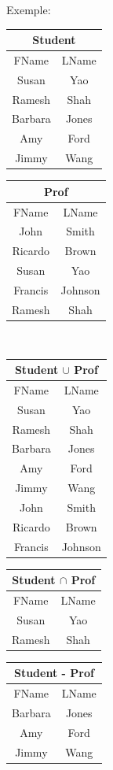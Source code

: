 \documentclass[a4paper]{article}
\begin{document}
  
      Exemple:
\begin{tabular}{|c|c|}
	\multicolumn{2}{c}{Student}\\
	\hline
	FName & LName\\
	\hline\hline
	Susan & Yao\\
	Ramesh & Shah\\
	Barbara & Jones\\
	Amy & Ford\\
	Jimmy & Wang\\
	\hline
\end{tabular}
\begin{tabular}{|c|c|}
	\multicolumn{2}{c}{Prof}\\
	\hline
	FName & LName\\
	\hline\hline
	John & Smith\\
	Ricardo & Brown\\
	Susan  &Yao\\
	Francis  & Johnson\\
	Ramesh & Shah\\
	\hline
\end{tabular}\\
\begin{tabular}{|c|c|}
	\multicolumn{2}{c}{\textcolor[rgb]{1,0,0}{Student $\cup$ Prof}}\\
	\hline
	FName & LName\\
	\hline\hline
	Susan & Yao\\
	Ramesh & Shah\\
	Barbara & Jones\\
	Amy & Ford\\
	Jimmy & Wang\\
	John & Smith\\
	Ricardo & Brown\\
	Francis & Johnson\\
	\hline
\end{tabular}
\begin{tabular}{|c|c|}
	\multicolumn{2}{c}{\textcolor[rgb]{1,0,0}{Student $\cap$ Prof}}\\
	\hline
	FName & LName\\
	\hline\hline
	Susan & Yao\\
	Ramesh & Shah\\
	\hline
\end{tabular}
\begin{tabular}{|c|c|}
	\multicolumn{2}{c}{\textcolor[rgb]{1,0,0}{Student - Prof}}\\
	\hline
	FName & LName\\
	\hline\hline
	Barbara & Jones\\
	Amy & Ford\\
	Jimmy & Wang\\
	\hline
\end{tabular}
	
\end{document}
